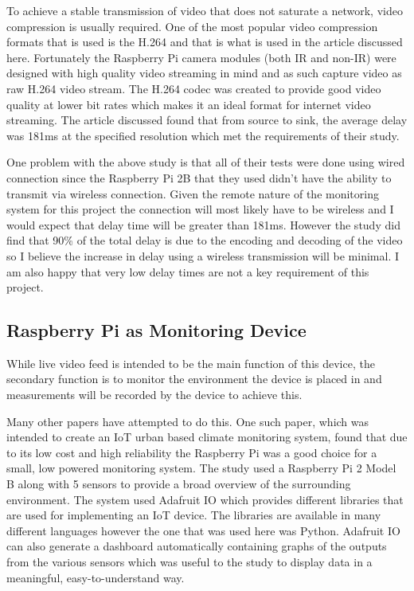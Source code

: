 \documentclass[10pt,a4paper]{article}
\begin{document}
To achieve a stable transmission of video that does not saturate a network, video compression is usually required. One of the most popular video compression formats that is used is the H.264 and that is what is used in the article discussed here. Fortunately the Raspberry Pi camera modules (both IR and non-IR) were designed with high quality video streaming in mind and as such capture video as raw H.264 video stream\cite{piDoc}. The H.264 codec was created to provide good video quality at lower bit rates which makes it an ideal format for internet video streaming\cite{Wiegand2003}. The article discussed found that from source to sink, the average delay was 181ms at the specified resolution which met the requirements of their study.

One problem with the above study is that all of their tests were done using wired connection since the Raspberry Pi 2B that they used didn't have the ability to transmit via wireless connection. Given the remote nature of the monitoring system for this project the connection will most likely have to be wireless and I would expect that delay time will be greater than 181ms. However the study did find that 90\% of the total delay is due to the encoding and decoding of the video so I believe the increase in delay using a wireless transmission will be minimal. I am also happy that very low delay times are not a key requirement of this project.
\subsection{Raspberry Pi as Monitoring Device}
While live video feed is intended to be the main function of this device, the secondary function is to monitor the environment the device is placed in and measurements will be recorded by the device to achieve this. 

Many other papers have attempted to do this. One such paper, which was intended to create an IoT urban based climate monitoring system, found that due to its low cost and high reliability the Raspberry Pi was a good choice for a small, low powered monitoring system\cite{Shete2016}. The study used a Raspberry Pi 2 Model B along with 5 sensors to provide a broad overview of the surrounding environment. The system used Adafruit IO which provides different libraries that are used for implementing an IoT device. The libraries are available in many different languages however the one that was used here was Python. Adafruit IO can also generate a dashboard automatically containing graphs of the outputs from the various sensors which was useful to the study to display data in a meaningful, easy-to-understand way. 
\end{document}
